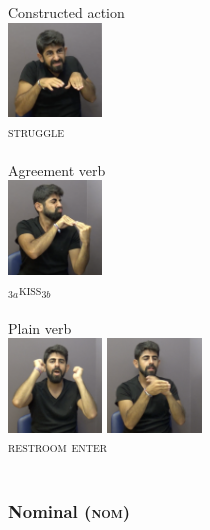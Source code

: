 \documentclass[
  english,
  doc,mask]{apa6}
\begin{document}
\begin{multicols}{3}
\begin{exe}
\ex
\begin{xlist}
\ex Constructed action \\\glll 
\includegraphics[width=2.5cm]{pictures/4c.png} \\ \textsc{struggle} \\ \\

\ex Agreement verb  \\\glll 
\includegraphics[width=2.5cm]{pictures/4b.png} \\ {\textsc{$_{3a}$kiss$_{3b}$}} \\ \\ 

\ex Plain verb  \\\glll
\includegraphics[width=2.5cm]{pictures/4a_1.png} \includegraphics[width=2.5cm]{pictures/4a_2.png}  \\ \textsc{restroom} \textsc{enter}\\ \\
\end{xlist}
\end{exe}
\end{multicols}

\hypertarget{nominal}{%
\subsubsection{\texorpdfstring{Nominal (\textsc{nom})}{Nominal ()}}\label{nominal}}
\end{document}
